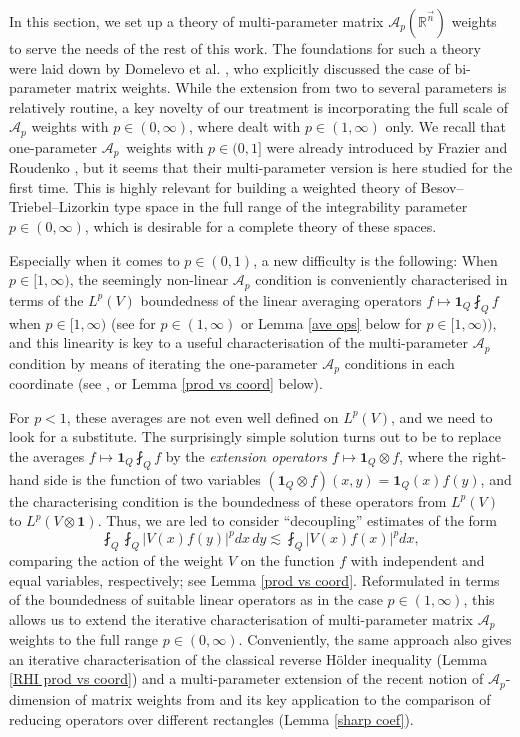 \documentclass[11pt, reqno]{amsart}
\theoremstyle{definition}
\theoremstyle{remark}
\numberwithin{equation}{section}
\newcommand{\A}{\mathscr A}
\newcommand{\one}{\mathbf{1}}
\newcommand{\abs}[1]{|#1|}
\begin{document}
In this section, we set up a theory of multi-parameter matrix $\A_p(\mathbb R^{\vec n})$ weights to serve the needs of the rest of this work. The foundations for such a theory were laid down by Domelevo et al. \cite{DKPS}, who explicitly discussed the case of bi-parameter matrix weights. While the extension from two to several parameters is relatively routine, a key novelty of our treatment is incorporating the full scale of $\A_p$ weights with $p\in(0,\infty)$, where \cite{DKPS} dealt with $p\in(1,\infty)$ only. We recall that one-parameter $\A_p$ weights with $p\in(0,1]$ were already introduced by Frazier and Roudenko \cite{FR04}, but it seems that their multi-parameter version is here studied for the first time. This is highly relevant for building a weighted theory of Besov--Triebel--Lizorkin type space in the full range of the integrability parameter $p\in(0,\infty)$, which is desirable for a complete theory of these spaces.

Especially when it comes to $p\in(0,1)$, a new difficulty is the following: When $p\in[1,\infty)$, the seemingly non-linear $\A_p$ condition is conveniently characterised in terms of the $L^p(V)$ boundedness of the linear averaging operators $f\mapsto\one_Q\fint_Q f$ when $p\in[1,\infty)$ (see \cite[Lemma 3.1]{DKPS} for $p\in(1,\infty)$ or Lemma \ref{ave ops} below for $p\in[1,\infty))$, and this linearity is key to a useful characterisation of the multi-parameter $\A_p$ condition by means of iterating the one-parameter $\A_p$ conditions in each coordinate (see \cite[Lemmas 3.6 and 3.7]{DKPS}, or Lemma \ref{prod vs coord} below).

For $p<1$, these averages are not even well defined on $L^p(V)$, and we need to look for a substitute. The surprisingly simple solution turns out to be to replace the averages $f\mapsto\one_Q\fint_Q f$ by the {\em extension operators} $f\mapsto\one_Q\otimes f$, where the right-hand side is the function of two variables $(\one_Q\otimes f)(x,y)=\one_Q(x)f(y)$, and the characterising condition is the boundedness of these operators from $L^p(V)$ to $L^p(V\otimes\one)$. Thus, we are led to consider ``decoupling'' estimates of the form
\begin{equation*}
   \fint_Q\fint_Q\abs{V(x)f(y)}^p dx\,dy
   \lesssim\fint_Q\abs{V(x)f(x)}^p dx,
\end{equation*}
comparing the action of the weight $V$ on the function $f$ with independent and equal variables, respectively; see Lemma \ref{prod vs coord}. Reformulated in terms of the boundedness of suitable linear operators as in the case $p\in(1,\infty)$, this allows us to extend the iterative characterisation of multi-parameter matrix $\A_p$ weights to the full range $p\in(0,\infty)$. Conveniently, the same approach also gives an iterative characterisation of the classical reverse H\"older inequality (Lemma \ref{RHI prod vs coord}) and a multi-parameter extension of the recent notion of $\A_p$-dimension of matrix weights from \cite{BHYY:1a} and its key application to the comparison of reducing operators over different rectangles (Lemma \ref{sharp coef}).
\end{document}
